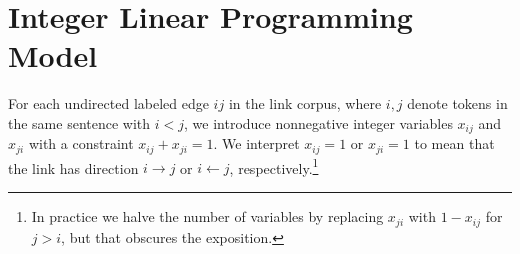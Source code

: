 \documentclass[a4paper,11pt]{article}
\newcommand{\Note}[4][]{\todo[author=#2,color=#3,fancyline,#1]{#4}}
\newcommand{\noteJH}[2][]{\Note[size=\small,#1]{JH}{blue!40}{#2}}
\newcommand{\noteJE}[2][]{\Note[size=\small,#1]{JE}{green!40}{#2}}
\newcommand{\NoteJE}[2][]{\noteJE[inline,#1]{#2}}
\begin{document}



%  


\section{Integer Linear Programming Model}

For each undirected labeled edge $ij$ in the link corpus, where $i,j$ denote tokens in the same sentence with $i < j$, we introduce nonnegative integer variables $x_{ij}$ and $x_{ji}$ with a constraint $x_{ij}+x_{ji}=1$.  We interpret $x_{ij}=1$ or $x_{ji}=1$ to mean that the link has direction $i \rightarrow j$ or $i \leftarrow j$, respectively.\footnote{In practice we halve the number of variables by replacing $x_{ji}$ with $1-x_{ij}$ for $j > i$, but that obscures the exposition.}

\end{document}
